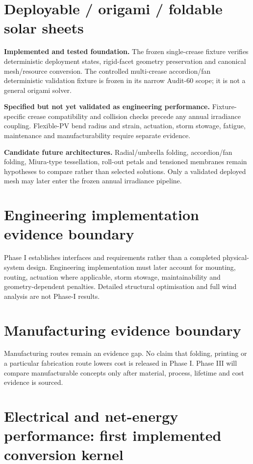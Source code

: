 \documentclass[11pt,a4paper]{article}
\begin{document}
\section{Deployable / origami / foldable solar sheets}
\textbf{Implemented and tested foundation.} The frozen single-crease fixture verifies deterministic deployment states, rigid-facet geometry preservation and canonical mesh/resource conversion. The controlled multi-crease accordion/fan deterministic validation fixture is frozen in its narrow Audit-60 scope; it is not a general origami solver.

\textbf{Specified but not yet validated as engineering performance.} Fixture-specific crease compatibility and collision checks precede any annual irradiance coupling. Flexible-PV bend radius and strain, actuation, storm stowage, fatigue, maintenance and manufacturability require separate evidence.

\textbf{Candidate future architectures.} Radial/umbrella folding, accordion/fan folding, Miura-type tessellation, roll-out petals and tensioned membranes remain hypotheses to compare rather than selected solutions. Only a validated deployed mesh may later enter the frozen annual irradiance pipeline.

\section{Engineering implementation evidence boundary}
Phase I establishes interfaces and requirements rather than a completed physical-system design. Engineering implementation must later account for mounting, routing, actuation where applicable, storm stowage, maintainability and geometry-dependent penalties. Detailed structural optimisation and full wind analysis are not Phase-I results.

\section{Manufacturing evidence boundary}
Manufacturing routes remain an evidence gap. No claim that folding, printing or a particular fabrication route lowers cost is released in Phase I. Phase III will compare manufacturable concepts only after material, process, lifetime and cost evidence is sourced.

\section{Electrical and net-energy performance: first implemented conversion kernel}
\end{document}

